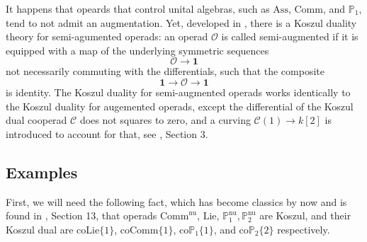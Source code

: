 \documentclass[10pt, oneside]{amsart}
\theoremstyle{plain}
\newcommand{\ass}{\mathrm{Ass}}
\newcommand{\C}{\mathcal{C}}
\newcommand{\comm}{\mathrm{Comm}}
\newcommand{\ccomm}{\mathrm{coComm}}
\newcommand{\colie}{\mathrm{coLie}}
\newcommand{\lie}{\mathrm{Lie}}
\renewcommand{\nu}{\mathrm{nu}}
\renewcommand{\O}{\mathcal{O}}
\newcommand{\PP}{\mathbb{P}}
\newcommand{\coP}{\mathrm{co}\PP}
\begin{document}
It happens that opeards that control unital algebras, such as $\ass$, $\comm$, and $\PP_1$, tend to not admit an augmentation. Yet,
developed in \cite{curved_Koszul}, there is a Koszul duality theory for semi-agumented operads: an operad $\O$ is called semi-augmented
if it is equipped with a map of the underlying symmetric sequences
\begin{equation*}
\O \longrightarrow \mathbf{1}
\end{equation*}
not necessarily commuting with the differentials, such that the composite
\begin{equation*}
\mathbf{1} \longrightarrow \O \longrightarrow \mathbf{1}
\end{equation*}
is identity. The Koszul duality for semi-augmented operads works identically to the Koszul duality for augemented operads, except the
differential of the Koszul dual cooperad $\C$ does not squares to zero, and a curving $\C(1) \longrightarrow k[2]$ is introduced
to account for that, see \cite{curved_Koszul}, Section 3.

\subsection{Examples}\label{subsec24}

First, we will need the following fact, which has become classics by now and is found in \cite{LV}, Section 13,
that operads $\comm^\text{nu}$, $\lie$, $\PP^\text{nu}_1, \PP^\nu_2$ are Koszul, and their Koszul dual are $\colie\{1\}$,
$\ccomm\{1\}$, $\coP_1\{1\}$, and $\coP_2\{2\}$ respectively.
\end{document}
